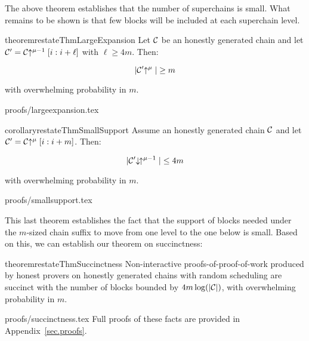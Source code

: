The above theorem establishes that the number of superchains is small. What
remains to be shown is that few blocks will be included at each superchain
level.

\begin{restatable}{theorem}{restateThmLargeExpansion}
    \label{thm.large-expansion}
    Let $\mathcal{C}$ be an honestly generated chain and let
    $\mathcal{C}' = \mathcal{C}\negthickspace\uparrow^{\mu - 1}[i:i + \ell]$ with $\ell \geq 4m$.
    Then:

    \begin{equation*}
      |\mathcal{C}'\negthickspace\uparrow^\mu| \geq m
    \end{equation*}

    with overwhelming probability in $m$.
\end{restatable}

\ifonecolumn
{proofs/largeexpansion.tex}
\fi

\begin{restatable}{corollary}{restateThmSmallSupport}
    \label{crly.small-support}
    Assume an honestly generated chain $\mathcal{C}$ and let $\mathcal{C}' = \mathcal{C}\negthickspace\uparrow^\mu[i:i + m]$. Then:

    \begin{equation}
      |\mathcal{C}'\negthickspace\downarrow\,\negthickspace\uparrow^{\mu - 1}| \leq 4m
    \end{equation}

    with overwhelming probability in $m$.
\end{restatable}

\ifonecolumn
{proofs/smallsupport.tex}
\fi

This last theorem establishes the fact that the support of blocks needed under
the $m$-sized chain suffix to move from one level to the one below is small.
Based on this, we can establish our theorem on succinctness:

\begin{restatable}{theorem}{restateThmSuccinctness}
    \label{thm.succinctness}
    Non-interactive proofs-of-proof-of-work produced by honest provers on
    honestly generated chains with random scheduling are succinct with the
    number of blocks bounded by $4m \log(|\mathcal{C}|)$, with overwhelming
    probability in $m$.
\end{restatable}

\ifonecolumn
{proofs/succinctness.tex}
\else
Full proofs of these facts are provided in Appendix~\ref{sec.proofs}.
\fi

